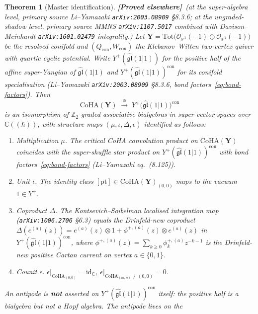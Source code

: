 \documentclass[11pt]{amsart}
\newtheorem{theorem}{Theorem}[section]
\theoremstyle{definition}
\providecommand{\CoHA}{\mathrm{CoHA}}
\providecommand{\bY}{\mathbf{Y}}
\providecommand{\cO}{\mathcal{O}}
\providecommand{\bP}{\mathbb{P}}
\providecommand{\Z}{\mathbb{Z}}
\providecommand{\C}{\mathbb{C}}
\providecommand{\fgl}{\mathfrak{gl}}
\providecommand{\ClaimStatusProvedElsewhere}{\textbf{\textsf{[Proved elsewhere]}}}
\begin{document}
\begin{theorem}[Master identification]
\label{thm:master}
\ClaimStatusProvedElsewhere\ \emph{(at the super-algebra level,
  primary source Li--Yamazaki \texttt{arXiv:2003.08909} §8.3.6;
  at the ungraded-shadow level, primary source MMNS
  \texttt{arXiv:1107.5017} combined with Davison--Meinhardt
  \texttt{arXiv:1601.02479} integrality.)}
Let $\bY = \mathrm{Tot}\bigl(\cO_{\bP^{1}}(-1)\oplus\cO_{\bP^{1}}(-1)\bigr)$
be the resolved conifold and
$(Q_{\mathrm{con}}, W_{\mathrm{con}})$ the Klebanov--Witten two-vertex
quiver with quartic cyclic potential. Write $Y^{+}(\widehat{\fgl}(1|1))$
for the positive half of the affine super-Yangian of
$\widehat{\fgl}(1|1)$ and
$Y^{+}(\widehat{\fgl}(1|1))^{\mathrm{con}}$ for its conifold
specialisation (Li--Yamazaki \texttt{arXiv:2003.08909} §8.3.6, bond
factors~\eqref{eq:bond-factors}). Then
\[
  \boxed{
    \;\CoHA(\bY) \;\stackrel{\cong}{\longrightarrow}\;
    Y^{+}\!\bigl(\widehat{\fgl}(1|1)\bigr)^{\mathrm{con}}\;
  }
\]
is an isomorphism of \emph{$\Z_{2}$-graded associative bialgebras in
super-vector spaces over $\C((\hbar))$}, with structure maps
$(\mu,\iota,\Delta,\epsilon)$ identified as follows:
\begin{enumerate}[label=\emph{(\alph*)}, leftmargin=2em]
\item \emph{Multiplication $\mu$.} The critical CoHA convolution
  product on $\CoHA(\bY)$ coincides with the super-shuffle star
  product on $Y^{+}(\widehat{\fgl}(1|1))^{\mathrm{con}}$ with bond
  factors~\eqref{eq:bond-factors} (Li--Yamazaki eq.~(8.125)).
\item \emph{Unit $\iota$.} The identity class $[\mathrm{pt}]\in
  \CoHA(\bY)_{(0,0)}$ maps to the vacuum $1 \in Y^{+}$.
\item \emph{Coproduct $\Delta$.} The Kontsevich--Soibelman localised
  integration map (\texttt{arXiv:1006.2706} §6.3) equals the
  Drinfeld-new coproduct
  $\Delta(e^{(a)}(z)) = e^{(a)}(z)\otimes 1 +
   \phi^{+,(a)}(z)\otimes e^{(a)}(z)$ in
  $Y^{+}(\widehat{\fgl}(1|1))^{\mathrm{con}}$, where
  $\phi^{+,(a)}(z) = \sum_{k\geq 0}\phi^{+,(a)}_{k}z^{-k-1}$ is the
  Drinfeld-new positive Cartan current on vertex $a\in\{0,1\}$.
\item \emph{Counit $\epsilon$.} $\epsilon|_{\CoHA_{(0,0)}} =
  \mathrm{id}_{\C}$, $\epsilon|_{\CoHA_{(m,n)}\neq(0,0)} = 0$.
\end{enumerate}
An \emph{antipode} is \textbf{not} asserted on
$Y^{+}(\widehat{\fgl}(1|1))^{\mathrm{con}}$ itself: the positive half
is a bialgebra but not a Hopf algebra. The antipode lives on the

\end{theorem}
\end{document}
